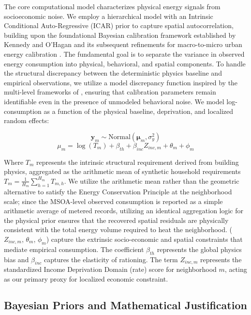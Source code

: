 \documentclass[11pt, a4paper, twocolumn, numbers]{elsarticle}
\begin{document}
The core computational model characterizes physical energy signals from
socioeconomic noise. We employ a hierarchical model with an Intrinsic
Conditional Auto-Regressive (ICAR) prior to capture spatial
autocorrelation, building upon the foundational Bayesian calibration
framework established by Kennedy and O'Hagan \cite{Kennedy2001} and its subsequent
refinements for macro-to-micro urban energy calibration \cite{Booth2013}. 
The fundamental goal is to separate the variance in observed energy 
consumption into physical, behavioral, and spatial components. To handle 
the structural discrepancy between the deterministic physics baseline 
and empirical observations, we utilize a model discrepancy function 
inspired by the multi-level frameworks of \cite{NetoBradley2021}, ensuring 
that calibration parameters remain identifiable even in the presence of 
unmodeled behavioral noise. We model log-consumption as a function of 
the physical baseline, deprivation, and localized random effects:

\[ \bm{y}_m \sim \text{Normal}(\bm{\mu}_m, \sigma_y^2) \]
\[ \mu_{m} = \log(T_{m}) + \beta_{th} + \beta_{inc} Z_{inc, m} + \theta_m + \phi_m \]

Where \(T_{m}\) represents the intrinsic structural requirement 
derived from building physics, aggregated as the arithmetic mean of synthetic household requirements \(T_{m} = \frac{1}{H_m} \sum_{h=1}^{H_m} T_{m,h}\). We utilize the arithmetic mean rather than the geometric alternative to satisfy the Energy Conservation Principle at the neighborhood scale; since the MSOA-level observed consumption is reported as a simple arithmetic average of metered records, utilizing an identical aggregation logic for the physical prior ensures that the recovered spatial residuals are physically consistent with the total energy volume required to heat the neighborhood.
(\(Z_{inc, m}\), \(\theta_m\), \(\phi_m\)) capture the 
extrinsic socio-economic and spatial constraints that mediate 
empirical consumption. The coefficient \(\beta_{th}\) represents the global physics bias and
\(\beta_{inc}\) captures the elasticity of rationing. The term
\(Z_{inc, m}\) represents the standardized Income Deprivation
Domain (rate) score for neighborhood \(m\), acting as our primary proxy
for localized economic constraint.

\subsection{Bayesian Priors and Mathematical
Justification}\label{bayesian-priors-and-mathematical-justification}
\end{document}
